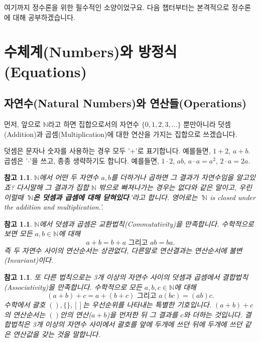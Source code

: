 \documentclass[a4paper, 11pt]{report}
\renewcommand{\<}{\langle}
\renewcommand{\>}{\rangle}
\newtheorem{remark}[thm]{참고}
\begin{document}
여기까지 정수론을 위한 필수적인 소양이었구요. 다음 챕터부터는 본격적으로 정수론에 대해 공부하겠습니다.


\chapter{수체계(Numbers)와 방정식(Equations)}

\section{자연수(Natural Numbers)와 연산들(Operations)}

먼저, 앞으로 $\mathbb{N}$라고 하면 집합으로서의 자연수 $\{0, 1, 2, 3, \ldots\}$ 뿐만아니라 
덧셈(Addition)과 곱셈(Multiplication)에 대한 연산을 가지는 집합으로 쓰겠습니다. 

덧셈은 문자나 숫자를 사용하는 경우 모두 '$+$'로 표기합니다. 예를들면, $1 + 2$, $a + b$.
곱셈은 '$\cdot$'을 쓰고, 종종 생략하기도 합니다. 
예를들면, $1\cdot2$, $ab$, $a\cdot a = a^2$, $2\cdot a = 2a$.

\begin{remark}
  $\mathbb{N}$에서 어떤 두 자연수 $a, b$를 더하거나 곱하면 그 결과가 자연수임을 알고있죠?
  다시말해 그 결과가 집합 $\mathbb{N}$ 밖으로 빠져나가는 경우는 없다와 같은 말이고, 우린 
  이럴때 '\textbf{$\mathbb{N}$은 덧셈과 곱셈에 대해 닫혀있다}.'라고 합니다. 영어로는
  '$\mathbb{N}$ is closed under the addition and multiplication.'.
\end{remark}

\begin{remark}
  $\mathbb{N}$에서 덧셈과 곱셈은 교환법칙(Commutativity)을 만족합니다. 수학적으로 보면
  모든 $a, b \in \mathbb{N}$에 대해
  $$
  a + b = b + a \text{ 그리고 } ab = ba.
  $$
  즉 두 자연수 사이의 연산순서는 상관없다, 다른말로 연산결과는 연산순서에 불변(Invariant)이다.
\end{remark}

\begin{remark}
  또 다른 법칙으로는 3개 이상의 자연수 사이의 덧셈과 곱셈에서 결합법칙(Associativity)을 만족합니다.
  수학적으로 모든 $a, b, c \in \mathbb{N}$에 대해 
  $$
  (a+b)+c = a+(b+c) \text{ 그리고 } a(bc) = (ab)c.
  $$
  수학에서 괄호 $(), \{\}, []$는 우선순위를 나타내는 특별한 기호입니다. $(a+b)+c$의 연산순서는
  $()$안의 연산($a+b$)을 먼저한 뒤 그 결과를 $c$와 더하는 것입니다. 결합법칙은 3개 이상의
  자연수 사이에서 괄호를 앞에 두개에 쓰던 뒤에 두개에 쓰던 같은 연산값을 갖는 것을 말합니다. 
\end{remark}
\end{document}
